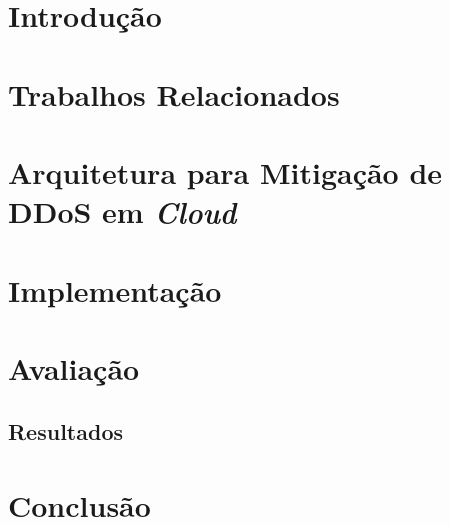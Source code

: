 \documentclass[a4paper, 12pt]{article}
\begin{document}

\section{Introdução}



\section{Trabalhos Relacionados}


\section{Arquitetura para Mitigação de DDoS em \emph{Cloud}}



\section{Implementação}


\section{Avaliação}




\subsection{Resultados}


\section{Conclusão}



%

%


% 



\end{document}
